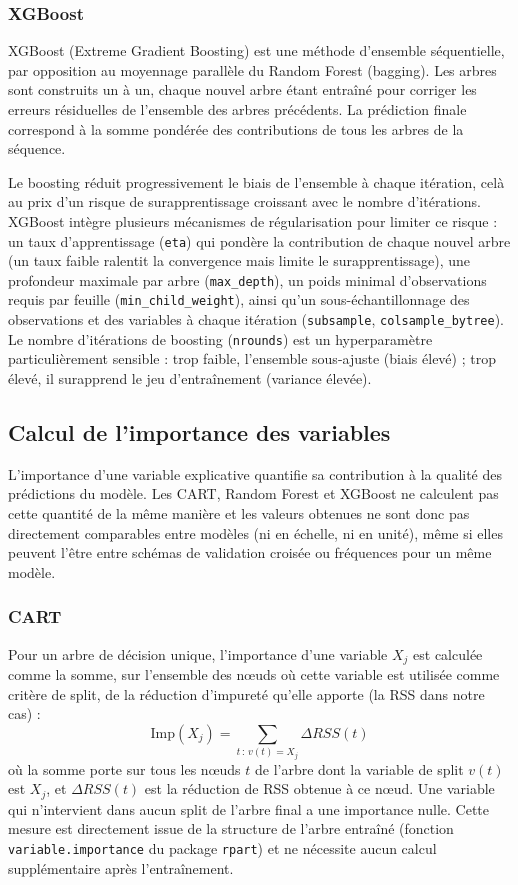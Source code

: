 \documentclass[11pt,a4paper,oneside]{report}
\begin{document}
	\subsubsection{XGBoost}
	XGBoost (Extreme Gradient Boosting) \cite{chen2016xgboost} est une méthode d'ensemble séquentielle, par opposition au moyennage parallèle du Random Forest (bagging). Les arbres sont construits un à un, chaque nouvel arbre étant entraîné pour corriger les erreurs résiduelles de l'ensemble des arbres précédents. La prédiction finale correspond à la somme pondérée des contributions de tous les arbres de la séquence.
	
	Le boosting réduit progressivement le biais de l'ensemble à chaque itération, celà au prix d'un risque de surapprentissage croissant avec le nombre d'itérations. XGBoost intègre plusieurs mécanismes de régularisation pour limiter ce risque : un taux d'apprentissage (\texttt{eta}) qui pondère la contribution de chaque nouvel arbre (un taux faible ralentit la convergence mais limite le surapprentissage), une profondeur maximale par arbre (\texttt{max\_depth}), un poids minimal d'observations requis par feuille (\texttt{min\_child\_weight}), ainsi qu'un sous-échantillonnage des observations et des variables à chaque itération (\texttt{subsample}, \texttt{colsample\_bytree}). Le nombre d'itérations de boosting (\texttt{nrounds}) est un hyperparamètre particulièrement sensible : trop faible, l'ensemble sous-ajuste (biais élevé) ; trop élevé, il surapprend le jeu d'entraînement (variance élevée).
	
	\subsection{Calcul de l'importance des variables}
	L'importance d'une variable explicative quantifie sa contribution à la qualité des prédictions du modèle. Les CART, Random Forest et XGBoost ne calculent pas cette quantité de la même manière et les valeurs obtenues ne sont donc pas directement comparables entre modèles (ni en échelle, ni en unité), même si elles peuvent l'être entre schémas de validation croisée ou fréquences pour un même modèle.
	
	\subsubsection{CART}
	Pour un arbre de décision unique, l'importance d'une variable $X_j$ est calculée comme la somme, sur l'ensemble des nœuds où cette variable est utilisée comme critère de split, de la réduction d'impureté qu'elle apporte (la RSS dans notre cas) \cite{breiman1984classification} :
	\begin{equation}
		\text{Imp}(X_j) = \sum_{t \,:\, v(t) = X_j} \Delta RSS(t)
	\end{equation}
	où la somme porte sur tous les nœuds $t$ de l'arbre dont la variable de split $v(t)$ est $X_j$, et $\Delta RSS(t)$ est la réduction de RSS obtenue à ce nœud. Une variable qui n'intervient dans aucun split de l'arbre final a une importance nulle. Cette mesure est directement issue de la structure de l'arbre entraîné (fonction \texttt{variable.importance} du package \texttt{rpart}) et ne nécessite aucun calcul supplémentaire après l'entraînement.
	
\end{document}
